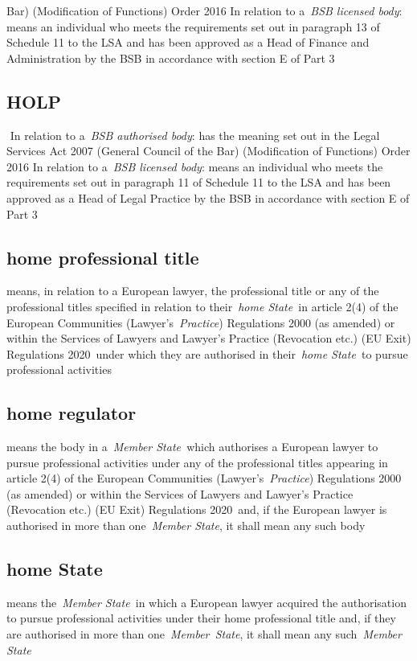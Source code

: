   Bar) (Modification of Functions) Order 2016 In relation to a~\emph{BSB
  licensed body}: means an individual who meets the requirements set out
  in paragraph 13 of Schedule 11 to the LSA and has been approved as a
  Head of Finance and Administration by the BSB in accordance with
  section E of Part 3  \subsection{HOLP } In relation to a~\emph{BSB authorised body}: has the
  meaning set out in the Legal Services Act 2007 (General Council of the
  Bar) (Modification of Functions) Order 2016 In relation to a~\emph{BSB
  licensed body}: means an individual who meets the requirements set out
  in paragraph 11 of Schedule 11 to the LSA and has been approved as a
  Head of Legal Practice by the BSB in accordance with section E of Part
  3  \subsection{home professional title } means, in relation to a European
  lawyer, the professional title or any of the professional titles
  specified in relation to their~\emph{home State~}in article 2(4) of
  the European Communities (Lawyer's~\emph{Practice}) Regulations 2000
  (as amended) or within the Services of Lawyers and Lawyer's Practice
  (Revocation etc.) (EU Exit) Regulations 2020~under which they are
  authorised in their~\emph{home State~}to pursue professional
  activities  \subsection{home regulator } means the body in a~\emph{Member
  State~}which authorises a European lawyer to pursue professional
  activities under any of the professional titles appearing in article
  2(4) of the European Communities (Lawyer's~\emph{Practice})
  Regulations 2000 (as amended) or within the Services of Lawyers and
  Lawyer's Practice (Revocation etc.) (EU Exit) Regulations 2020~and, if
  the European lawyer is authorised in more than one~\emph{Member
  State}, it shall mean any such body  \subsection{home State } means the~\emph{Member State~}in which a
  European lawyer acquired the authorisation to pursue professional
  activities under their home professional title and, if they are
  authorised in more than one~\emph{Member~State}, it shall mean any
  such~\emph{Member State} 
  
